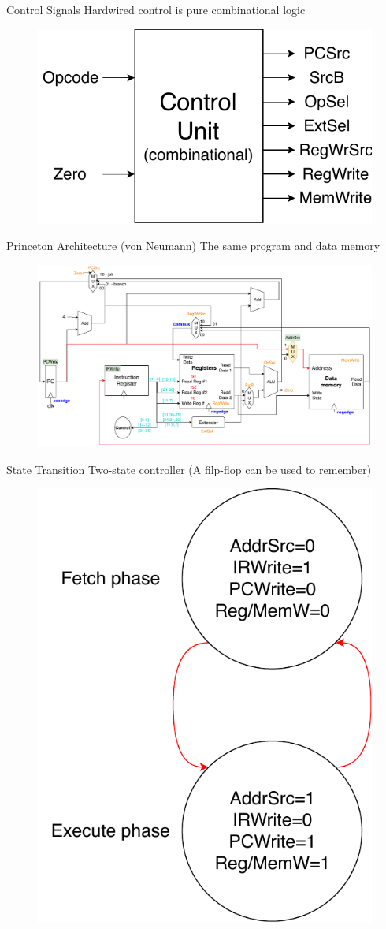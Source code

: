 \documentclass{myslide}
\begin{document}
\begin{frame}{Control Signals}
Hardwired control is pure combinational logic
\begin{figure}
\centering
\includegraphics[width=0.5\linewidth]{fig/Lecture2/Datapath-Control-signals.pdf}
\end{figure}
\end{frame}

\begin{frame}{Princeton Architecture (von Neumann)}
The same program and data memory
\begin{figure}
\centering
\includegraphics[width=\linewidth]{fig/Lecture2/Datapath-Princeton.pdf}
\end{figure}
\end{frame}

\begin{frame}{State Transition}
Two-state controller (A filp-flop can be used to remember)
\begin{figure}
\centering
\includegraphics[width=0.4\linewidth]{fig/Lecture2/Datapath-State.pdf}
\end{figure}
\end{frame}
\end{document}
